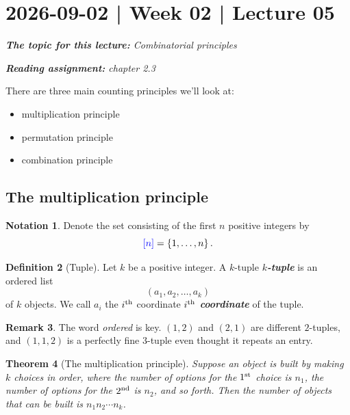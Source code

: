 \documentclass[10pt]{article}
\newtheorem{theorem}{Theorem}
\theoremstyle{definition}
\newtheorem{definition}[theorem]{Definition}
\newtheorem{remark}[theorem]{Remark}
\newtheorem{notation}[theorem]{Notation}
\newcommand{\1}[1]{\textbf{1}_{\left[#1\right]}} %
\DeclareRobustCommand{\demph}[1]{%
  \ifmmode
  {\color{Blue}#1}%
  \else
  {\color{Blue}\bfseries\slshape #1}%
  \fi
}
\begin{document}
\section{2026-09-02 | Week 02 | Lecture 05}
\begin{center}
  \begin{tcolorbox}[width=0.9\textwidth, colback=white, colframe=black]
    \textit{\textbf{The topic for this lecture:} Combinatorial principles}

    \textit{\textbf{Reading assignment:} chapter 2.3}
  \end{tcolorbox}
\end{center}
There are three main counting principles we'll look at:
\begin{itemize}
  \item multiplication principle
  \item permutation principle
  \item combination principle
\end{itemize}

\subsection{The multiplication principle}
\begin{notation}
  Denote the set consisting of the first $n$ positive integers by
  \begin{equation*}
    \demph{[n]} = \left\{1,\ldots,n\right\}.
  \end{equation*}
\end{notation}


\begin{definition}[Tuple]
  Let $k$ be a positive integer. A \demph{$k$-tuple} is an ordered list
  \begin{equation*}
    (a_1, a_2, \ldots, a_k)
  \end{equation*}
  of $k$ objects. We call $a_i$ the \demph{$i^{\rm th}$ coordinate} of the tuple.
\end{definition}

\begin{remark}
  The word \textit{ordered} is key. $(1,2)$ and $(2,1)$ are different
  $2$-tuples, and $(1,1,2)$ is a perfectly fine $3$-tuple even thought it
  repeats an entry.
\end{remark}

\begin{theorem}[The multiplication principle]
  \label{thm:multiplication-principle}
  Suppose an object is built by making $k$ choices in order, where the number
  of options for the $1^{\rm st}$ choice is $n_{1}$, the number of options for
  the $2^{\rm nd}$ is $n_{2}$, and so forth. Then the number of objects that
  can be built is $n_1n_2\cdots n_k$.
\end{theorem}
\end{document}

